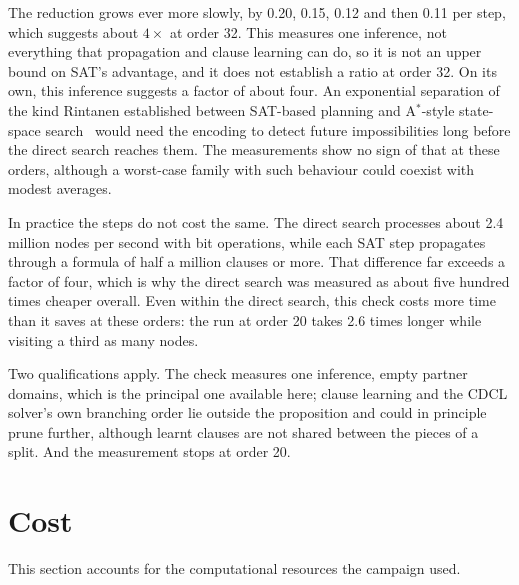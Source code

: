 \documentclass[11pt,a4paper,oneside]{report}
\theoremstyle{definition}
\begin{document}
The reduction grows ever more slowly, by 0.20, 0.15, 0.12 and then 0.11 per step, which suggests
about $4\times$ at order 32. This measures one inference, not everything that propagation and clause learning can do, so it is
not an upper bound on SAT's advantage, and it does not establish a ratio at order 32. On its own,
this inference suggests a factor of about four. An exponential separation of the kind Rintanen
established between SAT-based planning and A$^*$-style state-space search~\cite{p8-rintanen2011}
would need the encoding to detect future impossibilities long before the direct search reaches
them. The measurements show no sign of that at these orders, although a worst-case family with
such behaviour could coexist with modest averages.

In practice the steps do not cost the same. The direct search processes about 2.4 million nodes
per second with bit operations, while each SAT step propagates through a formula of half a million
clauses or more. That difference far exceeds a factor of four, which is why the direct search was
measured as about five hundred times cheaper overall. Even within the direct search, this check
costs more time than it saves at these orders: the run at order 20 takes 2.6 times longer while
visiting a third as many nodes.

Two qualifications apply. The check measures one inference, empty partner domains, which is the
principal one available here; clause learning and the CDCL solver's own branching order lie outside
the proposition and could in principle prune further, although learnt clauses are not shared
between the pieces of a split. And the measurement stops at order 20.


\section{Cost}\label{p8-sec:cost}
This section accounts for the computational resources the campaign used.

\end{document}
